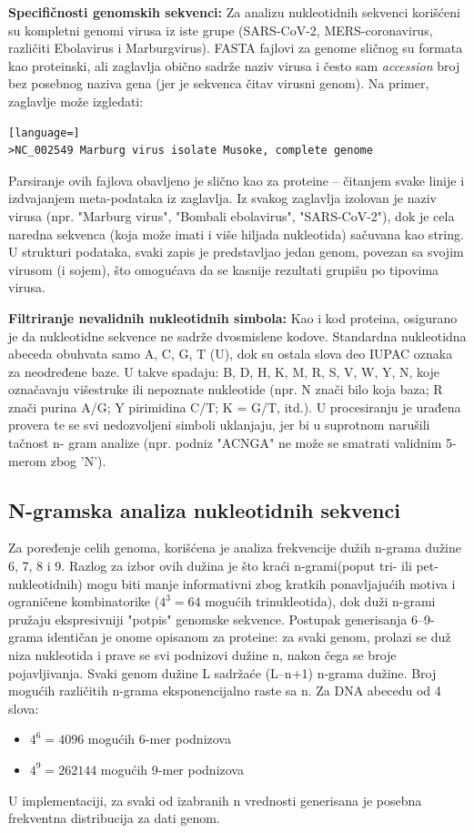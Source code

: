 \documentclass[a4paper,12pt]{article}
\begin{document}
\textbf{Specifičnosti genomskih sekvenci:} Za analizu nukleotidnih sekvenci korišćeni su kompletni genomi virusa
iz iste grupe (SARS-CoV-2, MERS-coronavirus, različiti Ebolavirus i Marburgvirus). FASTA fajlovi za genome
sličnog su formata kao proteinski, ali zaglavlja obično sadrže naziv virusa i često sam \textit{accession} broj
bez posebnog naziva gena (jer je sekvenca čitav virusni genom). Na primer, zaglavlje može izgledati:

\begin{lstlisting}[language=]
>NC_002549 Marburg virus isolate Musoke, complete genome
\end{lstlisting}

Parsiranje ovih fajlova obavljeno
je slično kao za proteine – čitanjem svake linije i izdvajanjem meta-podataka iz zaglavlja. Iz svakog zaglavlja
izolovan je naziv virusa (npr. "Marburg virus", "Bombali ebolavirus", "SARS-CoV-2"), dok je cela naredna sekvenca (koja može imati i više hiljada nukleotida) sačuvana kao
string. U strukturi podataka, svaki zapis je predstavljao jedan genom, povezan sa svojim virusom (i
sojem), što omogućava da se kasnije rezultati grupišu po tipovima virusa.

\vspace{10pt}
\textbf{Filtriranje nevalidnih nukleotidnih simbola:} Kao i kod proteina, osigurano je da nukleotidne sekvence ne
sadrže dvosmislene kodove. Standardna nukleotidna abeceda obuhvata samo A, C, G, T (U), dok su ostala
slova deo IUPAC oznaka za neodređene baze. U takve spadaju: B, D, H, K, M, R, S, V, W, Y, N, koje
označavaju višestruke ili nepoznate nukleotide (npr. N znači bilo koja baza; R znači purina A/G; Y pirimidina
C/T; K = G/T, itd.). U procesiranju je urađena provera
te se svi nedozvoljeni simboli uklanjaju, jer bi u suprotnom narušili tačnost n-
gram analize (npr. podniz "ACNGA" ne može se smatrati validnim 5-merom zbog 'N').

\subsection{N-gramska analiza nukleotidnih sekvenci}

Za poređenje celih genoma, korišćena je analiza frekvencije
dužih n-grama dužine 6, 7, 8 i 9. Razlog za izbor ovih dužina je što kraći n-grami(poput
tri- ili pet-nukleotidnih) mogu biti manje informativni zbog kratkih ponavljajućih motiva i ograničene
kombinatorike ($4^3 = 64$
 mogućih trinukleotida), dok duži n-grami pružaju ekspresivniji "potpis"
genomske sekvence. Postupak generisanja 6–9-grama identičan je onome opisanom za proteine: za svaki
genom, prolazi se duž niza nukleotida i prave se svi podnizovi dužine n, nakon čega se broje pojavljivanja. Svaki genom dužine L sadržaće (L–n+1) n-grama dužine. Broj mogućih različitih n-grama
eksponencijalno raste sa n. Za DNA abecedu od 4 slova: \begin{itemize}
    \item $4^6 = 4096$ mogućih 6-mer podnizova
    \item $4^9 = 262144$ mogućih 9-mer podnizova
\end{itemize}
U
implementaciji, za svaki od izabranih n vrednosti generisana je posebna frekventna distribucija za dati
genom.
\end{document}
